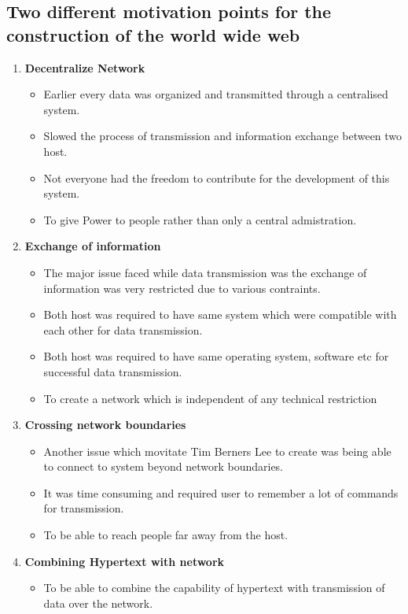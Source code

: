 \documentclass{resources/WeSTassignment}
\begin{document}
\begin{enumerate}
\subsection{Two different motivation points for the construction of the world wide web}
\begin{enumerate}
    \item \textbf{Decentralize Network}
	\begin{itemize}
    		\item Earlier every data was organized and transmitted through a centralised system.
		\item Slowed the process of transmission and information exchange between two host.
		\item Not everyone had the freedom to contribute for the development of this system.
		\item To give Power to people rather than only a central admistration.
	\end{itemize}
    \item \textbf{Exchange of information}
	\begin{itemize}
    		\item The major issue faced while data transmission was the exchange of information was very restricted due to various contraints.
		\item Both host was required to have same system which were compatible with each other for data transmission.
		\item Both host was required to have same operating system, software etc for successful data transmission.
		\item To create a network which is independent of any technical restriction
	\end{itemize}
    \item \textbf{Crossing network boundaries}
	\begin{itemize}
    		\item Another issue which movitate Tim Berners Lee to create was being able to connect to system beyond network boundaries.
		\item It was time consuming and required user to remember a lot of commands for transmission.
		\item To be able to reach people far away from the host.
	\end{itemize}
    \item \textbf{Combining Hypertext with network}
	\begin{itemize}
    		\item To be able to combine the capability of hypertext with transmission of data over the network.
	\end{itemize}
\end{enumerate}


\end{enumerate}
\end{document}
